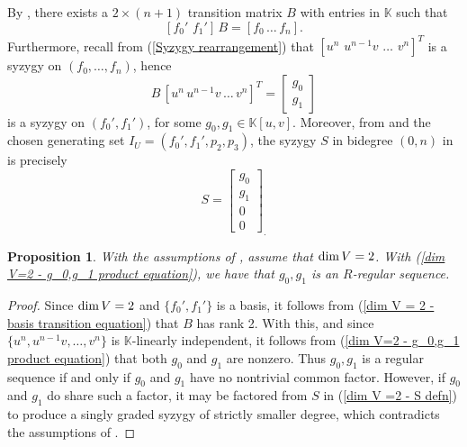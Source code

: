 \documentclass[reqno]{amsart}
\newtheorem{prop}[thm]{Proposition}
\numberwithin{equation}{section}
\theoremstyle{definition}
\def\K{\mathbb{K}}
\def\dim{\mathop{\rm dim}}
\begin{document}
By , there exists a $2\times (n+1)$ transition matrix $B$ with entries in $\K$ such that  
\begin{equation}\label{dim V = 2 - basis transition equation}
[f_0'\, \,f_1']\, B= [f_0\,\ldots\,f_n].
\end{equation}
Furthermore, recall from (\ref{Syzygy rearrangement}) that $[u^n\,\, u^{n-1}v\,\, \ldots \,\,v^n]^T$ is a syzygy on $(f_0,\ldots,f_n)$, hence  
\begin{equation}\label{dim V=2 - g_0,g_1 product equation}
    B\, [u^n\, u^{n-1}v\, \ldots \,v^n]^T = \begin{bmatrix}
    g_0\\
    g_1
\end{bmatrix}
\end{equation}
is a syzygy on $(f_0',f_1')$, for some $g_0,g_1\in \K[u,v]$. Moreover, from  and the chosen generating set $I_U = (f_0',f_1',p_2,p_3)$, the syzygy $S$ in bidegree $(0,n)$ in  is precisely
\begin{equation}\label{dim V =2 - S defn}
S=\begin{bmatrix}
    g_0\\
    g_1\\
    0\\
    0
\end{bmatrix}_.
\end{equation}



\begin{prop}\label{dim V = 2 - g_0 g_1 regular sequence}
With the assumptions of , assume that $\dim V =2$. With (\ref{dim V=2 - g_0,g_1 product equation}), we have that $g_0, g_1$ is an $R$-regular sequence.    
\end{prop}

\begin{proof}
Since $\dim V =2$ and $\{f_0',f_1'\}$ is a basis, it follows from (\ref{dim V = 2 - basis transition equation}) that $B$ has rank 2. With this, and since $\{u^n,u^{n-1}v,\ldots,v^n\}$ is $\K$-linearly independent, it follows from (\ref{dim V=2 - g_0,g_1 product equation}) that both $g_0$ and $g_1$ are nonzero. Thus $g_0, g_1$ is a regular sequence if and only if $g_0$ and $g_1$ have no nontrivial common factor. However, if $g_0$ and $g_1$ do share such a factor, it may be factored from $S$ in (\ref{dim V =2 - S defn}) to produce a singly graded syzygy of strictly smaller degree, which contradicts the assumptions of .    
\end{proof}
\end{document}
